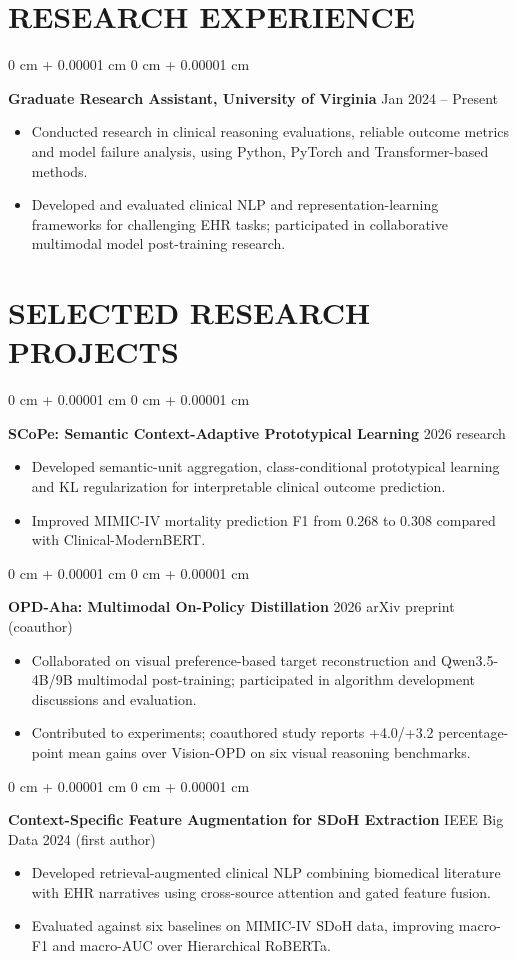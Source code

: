 \documentclass[10pt, letterpaper]{article}
\newenvironment{highlights}{
    \begin{itemize}[
        topsep=0.03 cm,
        parsep=0.03 cm,
        partopsep=0pt,
        itemsep=0pt,
        leftmargin=0 cm + 10pt
    ]
}{
    \end{itemize}
} %
\newenvironment{onecolentry}{
    \begin{adjustwidth}{
        0 cm + 0.00001 cm
    }{
        0 cm + 0.00001 cm
    }
}{
    \end{adjustwidth}
} %
\begin{document}
\section{RESEARCH EXPERIENCE}
\begin{onecolentry}
\textbf{Graduate Research Assistant, University of Virginia} \hfill Jan 2024 -- Present
\begin{highlights}
\item Conducted research in clinical reasoning evaluations, reliable outcome metrics and model failure analysis, using Python, PyTorch and Transformer-based methods.
\item Developed and evaluated clinical NLP and representation-learning frameworks for challenging EHR tasks; participated in collaborative multimodal model post-training research.
\end{highlights}
\end{onecolentry}
\section{SELECTED RESEARCH PROJECTS}
\begin{onecolentry}
\textbf{SCoPe: Semantic Context-Adaptive Prototypical Learning} \hfill 2026 research
\begin{highlights}
\item Developed semantic-unit aggregation, class-conditional prototypical learning and KL regularization for interpretable clinical outcome prediction.
\item Improved MIMIC-IV mortality prediction F1 from 0.268 to 0.308 compared with Clinical-ModernBERT.
\end{highlights}
\end{onecolentry}
\vspace{0.025 cm}
\begin{onecolentry}
\textbf{OPD-Aha: Multimodal On-Policy Distillation} \hfill 2026 arXiv preprint (coauthor)
\begin{highlights}
\item Collaborated on visual preference-based target reconstruction and Qwen3.5-4B/9B multimodal post-training; participated in algorithm development discussions and evaluation.
\item Contributed to experiments; coauthored study reports +4.0/+3.2 percentage-point mean gains over Vision-OPD on six visual reasoning benchmarks.
\end{highlights}
\end{onecolentry}
\vspace{0.025 cm}
\begin{onecolentry}
\textbf{Context-Specific Feature Augmentation for SDoH Extraction} \hfill IEEE Big Data 2024 (first author)
\begin{highlights}
\item Developed retrieval-augmented clinical NLP combining biomedical literature with EHR narratives using cross-source attention and gated feature fusion.
\item Evaluated against six baselines on MIMIC-IV SDoH data, improving macro-F1 and macro-AUC over Hierarchical RoBERTa.
\end{highlights}
\end{onecolentry}
\vspace{0.025 cm}
\end{document}
